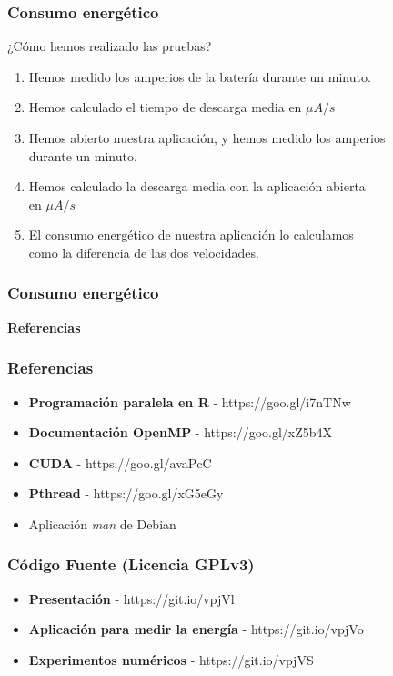 \documentclass[aspectratio=169]{beamer}
\begin{document}
\begin{frame}
	\frametitle{Consumo energético}
	¿Cómo hemos realizado las pruebas?
	\begin{enumerate}
		\item Hemos medido los amperios de la batería durante un minuto.
		\pause
		\item Hemos calculado el tiempo de descarga media en $\mu A/s$
		\pause
		\item Hemos abierto nuestra aplicación, y hemos medido los amperios \\durante un minuto.
		\pause
		\item Hemos calculado la descarga media con la aplicación abierta \\en $\mu A/s$
		\pause
		\item El consumo energético de nuestra aplicación lo calculamos \\como la diferencia de las dos velocidades.
	\end{enumerate}
\end{frame}

\begin{frame}
	\frametitle{Consumo energético}
\end{frame}

\begin{frame}
	\centering \LARGE \bfseries \color{naranjaUCA} Referencias
\end{frame}

\begin{frame}
	\frametitle{Referencias}
	\begin{itemize}
		\item \textbf{Programación paralela en R} - https://goo.gl/i7nTNw
		\item \textbf{Documentación OpenMP} - https://goo.gl/xZ5b4X
		\item \textbf{CUDA} - https://goo.gl/avaPcC
		\item \textbf{Pthread} - https://goo.gl/xG5eGy
		\item Aplicación \textit{man} de Debian
	\end{itemize}
\end{frame}

\begin{frame}
	\frametitle{Código Fuente (Licencia GPLv3)}
	\begin{itemize}
		\item \textbf{Presentación} - https://git.io/vpjVl
		\item \textbf{Aplicación para medir la energía} - https://git.io/vpjVo
		\item \textbf{Experimentos numéricos} - https://git.io/vpjVS
	\end{itemize}
\end{frame}
\end{document}
